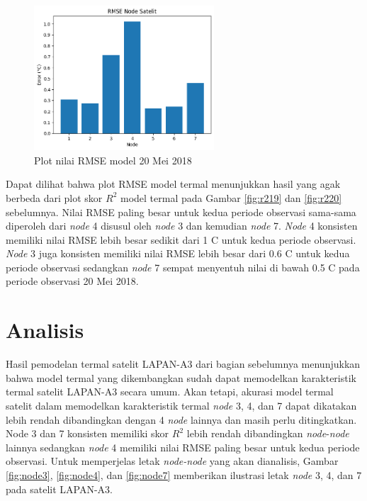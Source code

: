\begin{figure}[H]
\setlength{}
\begin{center}
\includegraphics[width=0.6\textwidth]{fig/rmse_2018-05-20.png}
\caption{Plot nilai RMSE model 20 Mei 2018}
\label{fig:rmse20}
\end{center}
\end{figure}

Dapat dilihat bahwa plot RMSE model termal menunjukkan hasil yang agak berbeda
dari plot skor $R^2$ model termal pada Gambar \ref{fig:r219} dan \ref{fig:r220}
sebelumnya. Nilai RMSE paling besar untuk kedua periode observasi sama-sama
diperoleh dari \textit{node} 4 disusul oleh \textit{node} 3 dan kemudian \textit{node} 7. \textit{Node} 4 konsisten
memiliki nilai RMSE lebih besar sedikit dari 1 \degree C untuk kedua periode
observasi. \textit{Node} 3 juga konsisten memiliki nilai RMSE lebih besar dari 0.6
\degree C untuk kedua periode observasi sedangkan \textit{node} 7 sempat menyentuh nilai
di bawah 0.5 \degree C pada periode observasi 20 Mei 2018.

\section{Analisis}

Hasil pemodelan termal satelit LAPAN-A3 dari bagian sebelumnya menunjukkan
bahwa model termal yang dikembangkan sudah dapat memodelkan karakteristik
termal satelit LAPAN-A3 secara umum. Akan tetapi, akurasi model termal satelit
dalam memodelkan karakteristik termal \textit{node} 3, 4, dan 7 dapat dikatakan lebih
rendah dibandingkan dengan 4 \textit{node} lainnya dan masih perlu ditingkatkan. Node 3
dan 7 konsisten memiliki skor $R^2$ lebih rendah dibandingkan \textit{node}-\textit{node} lainnya
sedangkan \textit{node} 4 memiliki nilai RMSE paling besar untuk kedua periode
observasi. Untuk memperjelas letak \textit{node-node} yang akan dianalisis, Gambar \ref{fig:node3}, \ref{fig:node4}, dan \ref{fig:node7} memberikan ilustrasi letak \textit{node} 3, 4, dan 7 pada satelit LAPAN-A3.

